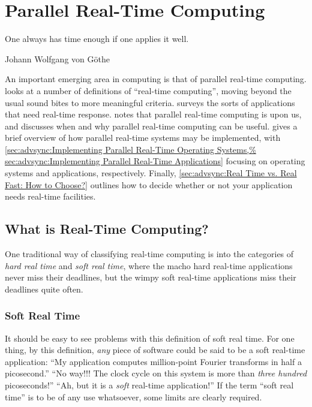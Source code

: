 
\section{Parallel Real-Time Computing}
\label{sec:advsync:Parallel Real-Time Computing}
%
\epigraph{One always has time enough if one applies it well.}
	 {Johann Wolfgang von G\"othe}

An important emerging area in computing is that of parallel real-time
computing.
looks at a number of definitions of ``real-time computing'', moving
beyond the usual sound bites to more meaningful criteria.
surveys the sorts of applications that need real-time response.
notes that parallel real-time computing is upon us, and discusses
when and why parallel real-time computing can be useful.
gives a brief overview of how parallel real-time systems may be implemented,
with
\cref{sec:advsync:Implementing Parallel Real-Time Operating Systems,%
sec:advsync:Implementing Parallel Real-Time Applications}
focusing on operating systems and applications, respectively.
Finally,
\cref{sec:advsync:Real Time vs. Real Fast: How to Choose?}
outlines how to decide whether or not your application needs real-time
facilities.

\subsection{What is Real-Time Computing?}
\label{sec:advsync:What is Real-Time Computing?}

One traditional way of classifying real-time computing is into the
categories of \emph{hard real time} and \emph{soft real time}, where
the macho hard real-time applications never miss their deadlines, but
the wimpy soft real-time applications miss their deadlines quite often.

\subsubsection{Soft Real Time}
\label{sec:Soft Real Time}

It should be easy to see problems with this definition of soft real time.
For one thing, by this definition, \emph{any} piece of software could be
said to be a soft real-time application:
``My application computes million-point Fourier transforms in half a
picosecond.''
``No way!!!
The clock cycle on this system is more than \emph{three hundred} picoseconds!''
``Ah, but it is a \emph{soft} real-time application!''
If the term ``soft real time'' is to be of any use whatsoever, some limits
are clearly required.

